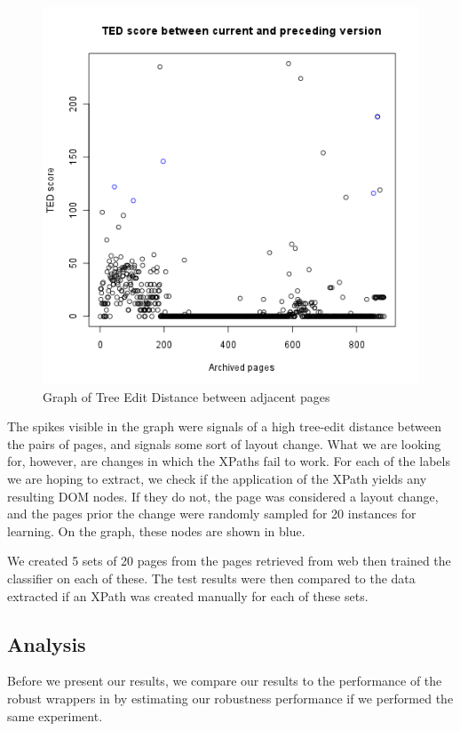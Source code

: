 \begin{figure}[htbp]
\centering
\includegraphics[scale=0.6]{scoregraph.png} 
\caption{Graph of Tree Edit Distance between adjacent pages}
\label{fig:scoregraph}
\end{figure}

	The spikes visible in the graph were signals of a high tree-edit distance between the pairs
of pages, and signals some sort of layout change. What we are looking for, however, are changes
in which the XPaths fail to work. For each of the labels we are hoping to extract, we check
if the application of the XPath yields any resulting DOM nodes. If they do not, the page was
considered a layout change, and the pages prior the change were randomly sampled for 20 instances
for learning. On the graph, these nodes are shown in blue.

	 We created 5 sets of 20 pages from the pages retrieved from web
then trained the classifier on each of these. The test results were then compared to the data
extracted if an XPath was created manually for each of these sets.
 
 
\subsection{Analysis}
Before we present our results, we compare our results to the performance
of the robust wrappers in \cite{Dalvi2009} by estimating our
robustness performance if we performed the same experiment.

